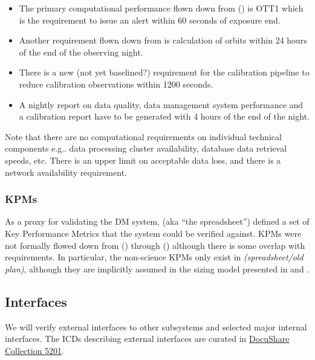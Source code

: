 \begin{itemize}

\item The primary computational performance flown down from  (\LSR) is OTT1 which is the requirement to issue an alert within 60 seconds of exposure end.

\item Another requirement flown down from  is calculation of orbits within 24 hours of the end of the observing night.

\item There is a new (not yet baselined?) requirement for the calibration pipeline to reduce calibration observations within 1200 seconds.

\item A nightly report on data quality, data management system performance and a calibration report have to be generated with 4 hours of the end of the night.

\end{itemize}

Note that there are no computational requirements on individual technical components e.g.. data processing cluster availability, database data retrieval speeds, etc. There is an upper limit on acceptable data loss, and there is a network availability requirement.

\subsubsection{KPMs}

As a proxy for validating the DM system,  (aka “the spreadsheet”) defined a set of Key Performance Metrics that the system could be verified against. KPMs were not formally flowed down from  (\LSR) through  (\OSS) although there is some overlap with  requirements. In particular, the non-science KPMs only exist in  \textit{(spreadsheet/old plan)}, although they are implicitly assumed in the sizing model presented in  and .

\subsection{Interfaces}

We will verify external interfaces to other subsystems and selected major internal interfaces. The ICDs describing external interfaces are curated in \href{https://ls.st/Collection-5201}{DocuShare Collection 5201}.
